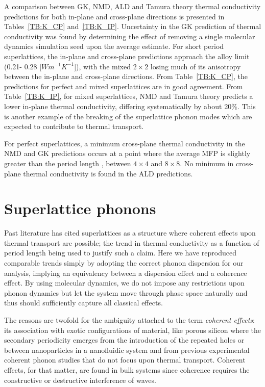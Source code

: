 \documentclass[aps,prb,preprint,preprintnumbers,amsmath,amssymb,floatfix,superscriptaddress]{revtex4}
\begin{document}
A comparison between GK, NMD, ALD and Tamura theory thermal conductivity predictions for both in-plane and cross-plane directions is presented in Tables~\ref{TB:K_CP} and~\ref{TB:K_IP}. Uncertainty in the GK prediction of thermal conductivity was found by determining the effect of removing a single molecular dynamics simulation seed upon the average estimate. For short period superlattices, the in-plane and cross-plane predictions approach the alloy limit (0.21- 0.28 [$Wm^{-1}K^{-1}$]), with the mixed $2\times 2$ losing much of its anisotropy between the in-plane and cross-plane directions. From Table~\ref{TB:K_CP}, the predictions for perfect and mixed superlattices are in good agreement. From Table~\ref{TB:K_IP}, for mixed superlattices, NMD and Tamura theory predicts a lower in-plane thermal conductivity, differing systematically by about 20\%. This is another example of the breaking of the superlattice phonon modes which are expected to contribute to thermal transport.

For perfect superlattices, a minimum cross-plane thermal conductivity in the NMD and GK predictions occurs at a point where the average MFP is slightly greater than the period length \cite{PhysRevLett.84.927}, between $4 \times 4$ and $8 \times 8$. No minimum in cross-plane thermal conductivity is found in the ALD predictions.

\section{Superlattice phonons}

Past literature has cited superlattices as a structure where coherent effects upon thermal transport are possible; the trend in thermal conductivity as a function of period length being used to justify such a claim.\cite{PhysRevB.67.195311,PhysRevB.72.174302,PhysRevB.61.3091} Here we have reproduced comparable trends simply by adopting the correct phonon dispersion for our analysis, implying an equivalency between a dispersion effect and a coherence effect. By using molecular dynamics, we do not impose any restrictions upon phonon dynamics but let the system move through phase space naturally and thus should sufficiently capture all classical effects. 

The reasons are twofold for the ambiguity attached to the term \textit {coherent effects}: its association with exotic configurations of material, like porous silicon \cite{doi:10.1021/nl102918q} where the secondary periodicity emerges from the introduction of the repeated holes or between nanoparticles in a nanofluidic system \cite{Keblinski2002855} and from previous experimental coherent phonon studies \cite{PhysRevLett.73.740,PhysRevB.75.195309} that do not focus upon thermal transport. Coherent effects, for that matter, are found in bulk systems since coherence requires the constructive or destructive interference of waves.
\end{document}
